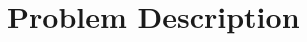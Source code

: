 \documentclass[sigconf]{acmart}
\begin{document}
\section{Problem Description}
\label{sec:angry}




\end{document}
